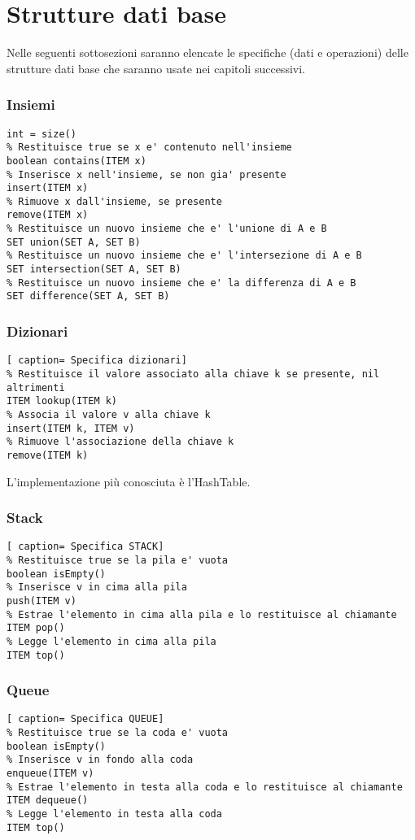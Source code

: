 \documentclass[../cheatSheetAlgoritmi.tex]{subfiles}
\begin{document}
\chapter{Strutture dati base}
Nelle seguenti sottosezioni saranno elencate le specifiche (dati e operazioni) delle strutture dati base che saranno usate nei capitoli successivi.

\subsection{Insiemi}
\begin{lstlisting}[caption= Specifica SET]
% Restituisce la cardinalita' dell'insieme
int = size()
% Restituisce true se x e' contenuto nell'insieme
boolean contains(ITEM x)
% Inserisce x nell'insieme, se non gia' presente
insert(ITEM x)
% Rimuove x dall'insieme, se presente
remove(ITEM x)
% Restituisce un nuovo insieme che e' l'unione di A e B
SET union(SET A, SET B)
% Restituisce un nuovo insieme che e' l'intersezione di A e B
SET intersection(SET A, SET B)
% Restituisce un nuovo insieme che e' la differenza di A e B
SET difference(SET A, SET B)
\end{lstlisting}

\subsection{Dizionari}
\begin{lstlisting}[ caption= Specifica dizionari]
% Restituisce il valore associato alla chiave k se presente, nil altrimenti
ITEM lookup(ITEM k)
% Associa il valore v alla chiave k
insert(ITEM k, ITEM v)
% Rimuove l'associazione della chiave k
remove(ITEM k)
\end{lstlisting}
L'implementazione più conosciuta è l'HashTable. 

\subsection{Stack}
\begin{lstlisting}[ caption= Specifica STACK]
% Restituisce true se la pila e' vuota
boolean isEmpty()
% Inserisce v in cima alla pila
push(ITEM v)
% Estrae l'elemento in cima alla pila e lo restituisce al chiamante
ITEM pop()
% Legge l'elemento in cima alla pila
ITEM top()
\end{lstlisting}

\newpage

\subsection{Queue}
\begin{lstlisting}[ caption= Specifica QUEUE]
% Restituisce true se la coda e' vuota
boolean isEmpty()
% Inserisce v in fondo alla coda
enqueue(ITEM v)
% Estrae l'elemento in testa alla coda e lo restituisce al chiamante
ITEM dequeue()
% Legge l'elemento in testa alla coda
ITEM top()
\end{lstlisting}
\newpage
\end{document}
